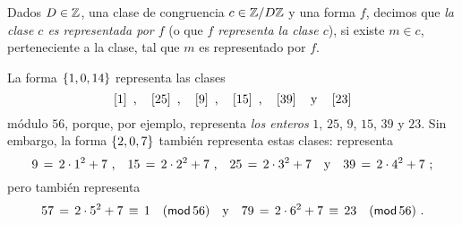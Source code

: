 
\begin{defGeneros}\label{def:generos:representacion:mod}
	Dados $D\in\Enteros$, una clase de congruencia
	$c\in\Enterosmod[D]$ y una forma $f$, decimos que
	\emph{la clase $c$ es representada por $f$} (o que \emph{$f$ %
	representa la clase $c$}), si existe $m\in c$, perteneciente a la
	clase, tal que $m$ es representado por $f$.
\end{defGeneros}

\begin{ejemGeneros}\label{ejem:generos:representacion:mod}
	La forma $\binaria{1,0,14}$ representa las clases
	\begin{displaymath}
		\clase 1\dispcomma\quad
		\clase{25}\dispcomma\quad
		\clase 9\dispcomma\quad
		\clase{15}\dispcomma\quad
		\clase{39}\dispand
		\clase{23}
	\end{displaymath}
	m\'odulo $56$, porque, por ejemplo, representa \emph{los enteros}
	$1$, $25$, $9$, $15$, $39$ y $23$. Sin embargo, la forma
	$\binaria{2,0,7}$ tambi\'en representa estas clases:
	representa
	\begin{displaymath}
		9\,=\,2\cdot 1^2+7\dispcomma\quad
		15\,=\,2\cdot 2^2+7\dispcomma\quad
		25\,=\,2\cdot 3^2+7\dispand
		39\,=\,2\cdot 4^2+7
		\text{ ;}
	\end{displaymath}
	pero tambi\'en representa
	\begin{displaymath}
		57\,=\,2\cdot 5^2+7\,\equiv\,1\modulo[56]
		\dispand
		79\,=\,2\cdot 6^2+7\,\equiv\,23\modulo[56]
		\dispstop
	\end{displaymath}
\end{ejemGeneros}


% 
% 

